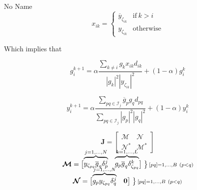 \documentclass[a4paper,10pt]{article}
\newcommand{\conj}[1]{\overline{#1}}
\newcommand\coolover[2]{\mathrlap{\smash{\overbrace{\phantom{%
    \begin{matrix} #2 \end{matrix}}}^{\mbox{$#1$}}}}#2}
\newcommand\coolrightbrace[2]{%
\left.\vphantom{\begin{matrix} #1 \end{matrix}}\right\}#2}
\begin{document}
\begin{section}{No Name}
\begin{equation}
x_{ik} = 
\begin{cases}
\conj{y}_{\zeta_{ik}} & \textrm{if}~k > i\\
y_{\zeta_{ik}} & \textrm{otherwise}
\end{cases}
\end{equation}

Which implies that 

\begin{equation}
g_{i}^{k+1} = \alpha \frac{\sum_{k\neq i } g_k x_{ik}d_{ik}}{|g_k|^2|y_{\zeta_{ik}}|^2} + (1-\alpha) g_i^k 
\end{equation}

\begin{equation}
y_{i}^{k+1} = \alpha \frac{\sum_{pq \in \mathcal{I}_j} \conj{g}_p g_q d_{pq}}{\sum_{pq \in \mathcal{I}_j}|g_p|^2|g_q|^2} + (1-\alpha) y_i^k 
\end{equation}

\begin{equation}
\boldsymbol{J} =
\begin{bmatrix}
\boldsymbol{\mathcal{M}} & \boldsymbol{\mathcal{N}}\\
\boldsymbol{\mathcal{N}}^* & \boldsymbol{\mathcal{M}}^*
\end{bmatrix}
\end{equation}

\begin{equation}
\boldsymbol{\mathcal{M}} = 
\begin{bmatrix}
\coolover{{\scriptstyle j=1,\ldots,N}}{y_{\zeta_{pq}} \conj{g}_q \delta_p^j} & \coolover{{\scriptstyle k=1,\ldots,L}}{g_p\conj{g}_q\delta_{\zeta_{pq}}^k}
\end{bmatrix}
\begin{matrix}%
\coolrightbrace{g_p\conj{g}_q\delta_{\zeta_{pq}}^k}{{\scriptstyle[pq] = 1,\ldots,B~(p<q)}}
\end{matrix}
\end{equation}

\begin{equation}
\boldsymbol{\mathcal{N}} = 
\begin{bmatrix}
\coolover{{\scriptstyle j=1,\ldots,N}}{g_p y_{\zeta_{pq}} \delta_q^j} & \boldsymbol{0}
\end{bmatrix}
\begin{matrix}%
\coolrightbrace{g_p\conj{g}_q\delta_{\zeta_{pq}}^k}{{\scriptstyle[pq] = 1,\ldots,B~(p<q)}}
\end{matrix}
\end{equation}





\end{section}
\end{document}
